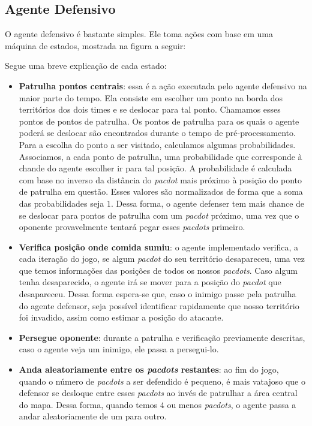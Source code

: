 \documentclass[a4paper,12pt]{article}
\begin{document}
\subsection{Agente Defensivo}
O agente defensivo é bastante simples. Ele toma ações com base em uma máquina de estados,
mostrada na figura a seguir:


Segue uma breve explicação de cada estado:

\begin{itemize}
  \item \textbf{Patrulha pontos centrais}: essa é a ação executada pelo agente defensivo
  na maior parte do tempo. Ela consiste em escolher um ponto na borda dos territórios
  dos dois times e se deslocar para tal ponto. Chamamos esses pontos de pontos de patrulha.
  Os pontos de patrulha para os quais o agente poderá se deslocar são encontrados durante o
  tempo de pré-processamento. Para a escolha do ponto a ser visitado, calculamos algumas
  probabilidades. Associamos, a cada ponto de patrulha, uma probabilidade que corresponde
  à chande do agente escolher ir para tal posição. A probabilidade é calculada com base
  no inverso da distância do \textit{pacdot} mais próximo à posição do ponto de patrulha
  em questão. Esses valores são normalizados de forma que a soma das probabilidades seja $1$.
  Dessa forma, o agente defenser tem mais chance de se deslocar para pontos de patrulha
  com um \textit{pacdot} próximo, uma vez que o oponente provavelmente tentará pegar
  esses \textit{pacdots} primeiro.

  \item \textbf{Verifica posição onde comida sumiu}: o agente implementado verifica,
  a cada iteração do jogo, se algum \textit{pacdot} do seu território desapareceu,
  uma vez que temos informações das posições de todos os nossos \textit{pacdots}.
  Caso algum tenha desaparecido, o agente irá se mover para a posição
  do \textit{pacdot} que desapareceu. Dessa forma espera-se que, caso o inimigo passe
  pela patrulha do agente defensor, seja possível identificar rapidamente que
  nosso território foi invadido, assim como estimar a posição do atacante.

  \item \textbf{Persegue oponente}: durante a patrulha e verificação previamente
  descritas, caso o agente veja um inimigo, ele passa a persegui-lo.

  \item \textbf{Anda aleatoriamente entre os \textit{pacdots} restantes}: ao fim do jogo,
  quando o número de \textit{pacdots} a ser defendido é pequeno, é mais vatajoso
  que o defensor se desloque entre esses \textit{pacdots} ao invés de patrulhar a área
  central do mapa. Dessa forma, quando temos $4$ ou menos \textit{pacdots}, o agente passa
  a andar aleatoriamente de um para outro.
\end{itemize}
\end{document}
